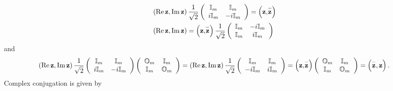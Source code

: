 \documentclass[aps,preprint]{revtex4}%
\begin{document}
\begin{align}
&  \left(  \operatorname{Re}\mathbf{z,}\operatorname{Im}\mathbf{z}\right)
\frac{1}{\sqrt{2}}\left(
\begin{array}
[c]{cc}%
\mathbb{I}_{m} & \mathbb{I}_{m}\\
i\mathbb{I}_{m} & -i\mathbb{I}_{m}%
\end{array}
\right)  =\left(  \mathbf{z,}\overset{-}{\mathbf{z}}\right)  \\
&  \left(  \operatorname{Re}\mathbf{z,}\operatorname{Im}\mathbf{z}\right)
=\left(  \mathbf{z,}\overset{-}{\mathbf{z}}\right)  \frac{1}{\sqrt{2}}\left(
\begin{array}
[c]{cc}%
\mathbb{I}_{m} & -i\mathbb{I}_{m}\\
\mathbb{I}_{m} & i\mathbb{I}_{m}%
\end{array}
\right)
\end{align}
and%
\begin{equation}
\left(  \operatorname{Re}\mathbf{z,}\operatorname{Im}\mathbf{z}\right)
\frac{1}{\sqrt{2}}\left(
\begin{array}
[c]{cc}%
\mathbb{I}_{m} & \mathbb{I}_{m}\\
i\mathbb{I}_{m} & -i\mathbb{I}_{m}%
\end{array}
\right)  \left(
\begin{array}
[c]{cc}%
\mathbb{O}_{m} & \mathbb{I}_{m}\\
\mathbb{I}_{m} & \mathbb{O}_{m}%
\end{array}
\right)  =\left(  \operatorname{Re}\mathbf{z,}\operatorname{Im}\mathbf{z}%
\right)  \frac{1}{\sqrt{2}}\left(
\begin{array}
[c]{cc}%
\mathbb{I}_{m} & \mathbb{I}_{m}\\
-i\mathbb{I}_{m} & i\mathbb{I}_{m}%
\end{array}
\right)  =\left(  \mathbf{z,}\overset{-}{\mathbf{z}}\right)  \left(
\begin{array}
[c]{cc}%
\mathbb{O}_{m} & \mathbb{I}_{m}\\
\mathbb{I}_{m} & \mathbb{O}_{m}%
\end{array}
\right)  =\left(  \overset{-}{\mathbf{z}},\mathbf{z}\right)  .
\end{equation}
Complex conjugation is given by
\end{document}
